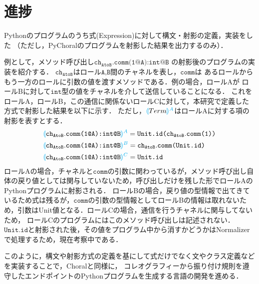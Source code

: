 \documentclass[11pt]{jarticle}
\newcommand{\projection}[2]{{\color{cyan}\llparenthesis}#1{\color{cyan}\rrparenthesis^#2}}
\begin{document}
\section{進捗}
Pythonのプログラムのうち式(Expression)に対して構文・射影の定義，実装をした
（ただし，PyChoralのプログラムを射影した結果を出力するのみ）．

例として，メソッド呼び出し$\texttt{ch}_\texttt{AtoB}.\texttt{comm(1@A):int@B}$
の射影後のプログラムの実装を紹介する．
$\texttt{ch}_{\texttt{AtoB}}$はロール$\texttt{A,B}$間のチャネルを表し，$\texttt{comm}$は
あるロールからもう一方のロールに引数の値を渡すメソッドである．例の場合，ロールAが
ロールBに対して$\texttt{int}$型の値をチャネルを介して送信していることになる．
これをロールA，ロールB，この通信に関係ないロールCに対して，本研究で定義した方式で射影した結果を以下に示す．
ただし，$\projection{Term}{A}$はロールAに対する項の射影を表すとする．
\begin{align*}
  &\projection{\texttt{ch}_\texttt{AtoB}.\texttt{comm(1@A):int@B}}{A} = \texttt{Unit.id(}\texttt{ch}_\texttt{AtoB}.\texttt{comm(1))}\\
  &\projection{\texttt{ch}_\texttt{AtoB}.\texttt{comm(1@A):int@B}}{B} = \texttt{ch}_\texttt{AtoB}.\texttt{comm(\texttt{Unit.id})}\\
  &\projection{\texttt{ch}_\texttt{AtoB}.\texttt{comm(1@A):int@B}}{C} = \texttt{Unit.id}
\end{align*}
ロールAの場合，チャネルと$\texttt{comm}$の引数に関わっているが，メソッド呼び出し自体の戻り値としては関与していないため，呼び出しだけを残した形でロールAのPythonプログラムに射影される．
ロールBの場合，戻り値の型情報で出てきているため式は残るが，$\texttt{comm}$の引数の型情報としてロールBの情報は取れないため，引数はUnit値となる．ロールCの場合，通信を行うチャネルに関与してないため，
ロールCのプログラムにはこのメソッド呼び出しは記述されない．
$\texttt{Unit.id}$と射影された後，その値をプログラム中から消すかどうかはNormalizerで処理するため，現在考察中である．

このように，構文や射影方式の定義を基にして式だけでなく文やクラス定義などを実装することで，Choralと同様に，
コレオグラフィーから振り付け規則を遵守したエンドポイントのPythonプログラムを生成する言語の開発を進める．
\end{document}
